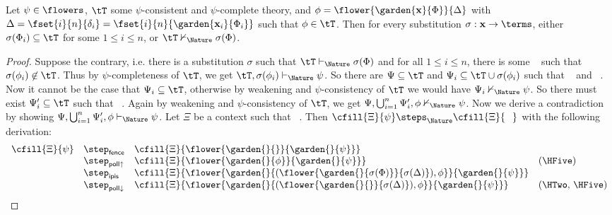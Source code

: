 \begin{proposition}
  
  Let $\psi \in \flowers$, $\tT$ some $\psi$-consistent and $\psi$-complete
  theory, and $\phi = \flower{\garden{\mathbf{x}}{\Phi}}{\Delta}$ with $\Delta
  = \fset{i}{n}{\delta_i} = \fset{i}{n}{\garden{\mathbf{x}_i}{\Phi_i}}$ such
  that $\phi \in \tT$. Then for every substitution $\sigma : \mathbf{x} \to
  \terms$, either $\sigma(\Phi_i) \subseteq \tT$ for some $1 \leq i \leq n$, or $\tT
  \nvdash_\Nature \sigma(\Phi)$.
\end{proposition}
\begin{proof}
  Suppose the contrary, i.e. there is a substitution $\sigma$ such that $\tT
  \vdash_\Nature \sigma(\Phi)$ and for all $1 \leq i \leq n$, there is some
  ~{\HOne} such that $\sigma(\phi_i) \not\in \tT$. Thus
  by $\psi$-completeness of $\tT$, we get $\tT, \sigma(\phi_i) \vdash_\Nature
  \psi$. So there are $\Psi \subseteq \tT$ and $\Psi_i \subseteq \tT \cup
  \sigma(\phi_i)$ such that \Hyp{$\Psi \vdash_\Nature \sigma(\Phi)$}~{\HTwo} and
  ~{\HThree}. Now it cannot be the case that
  $\Psi_i \subseteq \tT$, otherwise by weakening and $\psi$-consistency of $\tT$
  we would have $\Psi_i \nvdash_\Nature \psi$. So there must exist $\Psi_i'
  \subseteq \tT$ such that ~{\HFour}. Again by weakening and $\psi$-consistency of $\tT$,
  we get $\Psi, \bigcup_{i = 1}^{n}{\Psi_i'}, \phi \nvdash_\Nature \psi$. Now we
  derive a contradiction by showing $\Psi, \bigcup_{i = 1}^{n}{\Psi_i'}, \phi
  \vdash_\Nature \psi$. Let $\Xi$ be a context such that ~{\HFive}. Then $\cfill{\Xi}{\psi}
  \steps_\Nature \cfill{\Xi}{\phantom{\Phi}}$ with the following derivation:
  $$
  \begin{array}{rlll}
    \cfill{\Xi}{\psi}
    &\step_{\mathsf{fence}} &\cfill{\Xi}{\flower{\garden{{}}{{}}}{\garden{{}}{\psi}}} & \\
    &\step_{\mathsf{poll{\uparrow}}} &\cfill{\Xi}{\flower{\garden{{}}{\phi}}{\garden{{}}{\psi}}} &\text{(\HFive)} \\
    &\step_{\mathsf{ipis}} &\cfill{\Xi}{\flower{\garden{{}}{(\flower{\garden{}{\sigma(\Phi)}}{\sigma(\Delta)}), \phi}}{\garden{{}}{\psi}}} & \\
    &\step_{\mathsf{poll{\downarrow}}} &\cfill{\Xi}{\flower{\garden{{}}{(\flower{\garden{}{{}}}{\sigma(\Delta)}), \phi}}{\garden{{}}{\psi}}} &\text{(\HTwo, \HFive)} \\

\end{array}$$
\end{proof}
